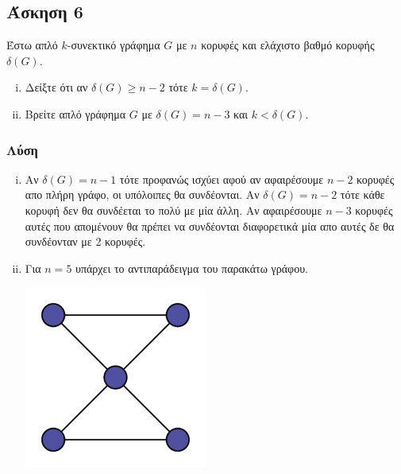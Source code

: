 \subsection*{Άσκηση 6}

Έστω απλό $k$-συνεκτικό γράφημα $G$ με $n$ κορυφές και ελάχιστο βαθμό κορυφής $\delta(G)$.

\begin{enumerate}[(i)]
\item Δείξτε ότι αν $\delta(G) \ge n-2$ τότε $k = \delta(G)$.
\item Βρείτε απλό γράφημα $G$ με $\delta(G) = n - 3 $ και $k < \delta(G)$.
\end{enumerate}

\subsubsection*{Λύση}

\begin{enumerate}[(i)]
\item 

Aν $\delta(G) = n-1$ τότε προφανώς ισχύει αφού αν αφαιρέσουμε $n-2$ κορυφές απο πλήρη γράφο, οι υπόλοιπες
θα συνδέονται. Αν $\delta(G) = n-2$ τότε κάθε κορυφή δεν θα συνδέεται το πολύ με μία άλλη. Αν αφαιρέσουμε
$n-3$ κορυφές αυτές που απομένουν θα πρέπει να συνδέονται διαφορετικά μία απο αυτές δε θα συνδέονταν 
με 2 κορυφές.

\item
    Για $n=5$ υπάρχει το αντιπαράδειγμα του παρακάτω γράφου.

        \begin{center}
        \includegraphics[height=6cm, width=.3\textwidth]{exercise6/diagrams/d1.png}
        \end{center}

\end{enumerate}
